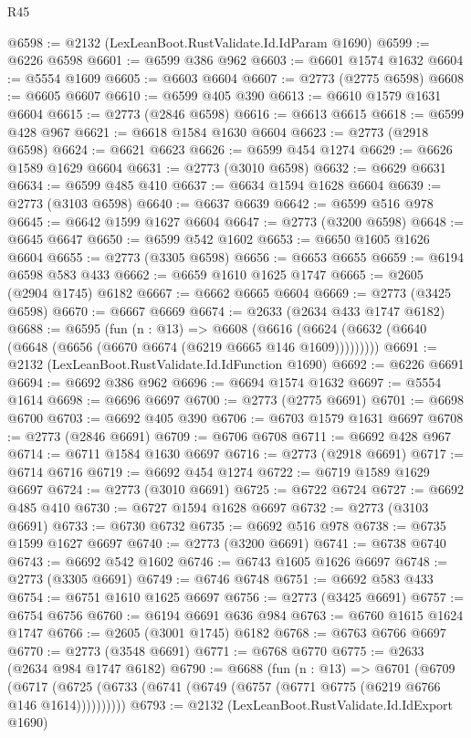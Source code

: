 \begin{lexlean}{R45}
\begin{coremodule}
@6598 := @2132 (LexLeanBoot.RustValidate.Id.IdParam @1690)
@6599 := @6226 @6598
@6601 := @6599 @386 @962
@6603 := @6601 @1574 @1632
@6604 := @5554 @1609
@6605 := @6603 @6604
@6607 := @2773 (@2775 @6598)
@6608 := @6605 @6607
@6610 := @6599 @405 @390
@6613 := @6610 @1579 @1631 @6604
@6615 := @2773 (@2846 @6598)
@6616 := @6613 @6615
@6618 := @6599 @428 @967
@6621 := @6618 @1584 @1630 @6604
@6623 := @2773 (@2918 @6598)
@6624 := @6621 @6623
@6626 := @6599 @454 @1274
@6629 := @6626 @1589 @1629 @6604
@6631 := @2773 (@3010 @6598)
@6632 := @6629 @6631
@6634 := @6599 @485 @410
@6637 := @6634 @1594 @1628 @6604
@6639 := @2773 (@3103 @6598)
@6640 := @6637 @6639
@6642 := @6599 @516 @978
@6645 := @6642 @1599 @1627 @6604
@6647 := @2773 (@3200 @6598)
@6648 := @6645 @6647
@6650 := @6599 @542 @1602
@6653 := @6650 @1605 @1626 @6604
@6655 := @2773 (@3305 @6598)
@6656 := @6653 @6655
@6659 := @6194 @6598 @583 @433
@6662 := @6659 @1610 @1625 @1747
@6665 := @2605 (@2904 @1745) @6182
@6667 := @6662 @6665 @6604
@6669 := @2773 (@3425 @6598)
@6670 := @6667 @6669
@6674 := @2633 (@2634 @433 @1747 @6182)
@6688 := @6595
    (fun (n : @13) =>
    @6608 (@6616 (@6624 (@6632 (@6640 (@6648 (@6656 (@6670 @6674 (@6219 @6665 @146 @1609)))))))))
@6691 := @2132 (LexLeanBoot.RustValidate.Id.IdFunction @1690)
@6692 := @6226 @6691
@6694 := @6692 @386 @962
@6696 := @6694 @1574 @1632
@6697 := @5554 @1614
@6698 := @6696 @6697
@6700 := @2773 (@2775 @6691)
@6701 := @6698 @6700
@6703 := @6692 @405 @390
@6706 := @6703 @1579 @1631 @6697
@6708 := @2773 (@2846 @6691)
@6709 := @6706 @6708
@6711 := @6692 @428 @967
@6714 := @6711 @1584 @1630 @6697
@6716 := @2773 (@2918 @6691)
@6717 := @6714 @6716
@6719 := @6692 @454 @1274
@6722 := @6719 @1589 @1629 @6697
@6724 := @2773 (@3010 @6691)
@6725 := @6722 @6724
@6727 := @6692 @485 @410
@6730 := @6727 @1594 @1628 @6697
@6732 := @2773 (@3103 @6691)
@6733 := @6730 @6732
@6735 := @6692 @516 @978
@6738 := @6735 @1599 @1627 @6697
@6740 := @2773 (@3200 @6691)
@6741 := @6738 @6740
@6743 := @6692 @542 @1602
@6746 := @6743 @1605 @1626 @6697
@6748 := @2773 (@3305 @6691)
@6749 := @6746 @6748
@6751 := @6692 @583 @433
@6754 := @6751 @1610 @1625 @6697
@6756 := @2773 (@3425 @6691)
@6757 := @6754 @6756
@6760 := @6194 @6691 @636 @984
@6763 := @6760 @1615 @1624 @1747
@6766 := @2605 (@3001 @1745) @6182
@6768 := @6763 @6766 @6697
@6770 := @2773 (@3548 @6691)
@6771 := @6768 @6770
@6775 := @2633 (@2634 @984 @1747 @6182)
@6790 := @6688
    (fun (n : @13) =>
    @6701
      (@6709
        (@6717 (@6725 (@6733 (@6741 (@6749 (@6757 (@6771 @6775 (@6219 @6766 @146 @1614))))))))))
@6793 := @2132 (LexLeanBoot.RustValidate.Id.IdExport @1690)

\end{coremodule}
\end{lexlean}

